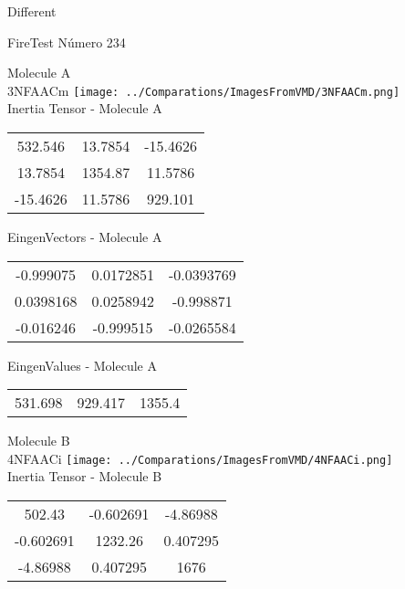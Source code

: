 \begin{center}
\vtab
\vtab
\textcolor{NavyBlue}{\Large Different}
\end{center}

 \newpage

\vtab[-2cm]
\begin{center}
{\large FireTest \tab Número 234}
\end{center}
\begin{multicols}{2}
\begin{center}

Molecule A \\ 
3NFAACm
\texttt{[image: ../Comparations/ImagesFromVMD/3NFAACm.png]}
\\
Inertia Tensor - Molecule A \\
\vtab

\begin{tabular}{|c c c|}
532.546	 & 	13.7854	 & 	-15.4626	 \\
13.7854	 & 	1354.87	 & 	11.5786	 \\
-15.4626	 & 	11.5786	 & 	929.101
\end{tabular}

\vtab
 EingenVectors - Molecule A     \\
\vtab
\begin{tabular}{|c c c|}
-0.999075	 & 	0.0172851	 & 	-0.0393769	 \\
0.0398168	 & 	0.0258942	 & 	-0.998871	 \\
-0.016246	 & 	-0.999515	 & 	-0.0265584
\end{tabular}

\vtab
 EingenValues - Molecule A     \\
\vtab
\begin{tabular}{|c c c|}
531.698	 & 	929.417	 & 	1355.4	 \\
\end{tabular}
\columnbreak

Molecule B \\ 
4NFAACi
\texttt{[image: ../Comparations/ImagesFromVMD/4NFAACi.png]}
\\
Inertia Tensor - Molecule B \\
\vtab

\begin{tabular}{|c c c|}
502.43	 & 	-0.602691	 & 	-4.86988	 \\
-0.602691	 & 	1232.26	 & 	0.407295	 \\
-4.86988	 & 	0.407295	 & 	1676
\end{tabular}


\end{center}
\end{multicols}
